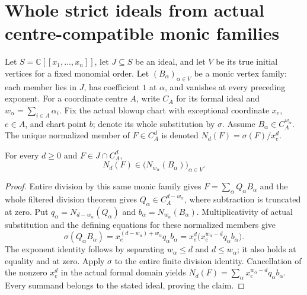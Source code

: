 \section{Whole strict ideals from actual centre-compatible monic families}

Let $S=\mathbb C[[x_1,\ldots,x_n]]$, let $J\subseteq S$ be an ideal,
and let $V$ be its true initial vertices for a fixed monomial order.
Let $(B_\alpha)_{\alpha\in V}$ be a monic vertex family: each member lies
in $J$, has coefficient $1$ at $\alpha$, and vanishes at every preceding
exponent. For a coordinate centre $A$, write $C_A$ for its formal ideal and
$w_\alpha=\sum_{i\in A}\alpha_i$. Fix the actual blowup chart with
exceptional coordinate $x_e$, $e\in A$, and chart point $b$; denote its
whole substitution by $\sigma$. Assume $B_\alpha\in C_A^{w_\alpha}$.
The unique normalized member of $F\in C_A^d$ is denoted
$N_d(F)=\sigma(F)/x_e^d$.

\begin{lemma}
\label{hir:actual-family-normalized-member-generation}
\leanok
For every $d\geq0$ and $F\in J\cap C_A^d$,
\[
 N_d(F)\in \bigl(N_{w_\alpha}(B_\alpha)\bigr)_{\alpha\in V}.
\]
\end{lemma}
\begin{proof}
Entire division by this same monic family gives
$F=\sum_\alpha Q_\alpha B_\alpha$ and the whole filtered division theorem
gives $Q_\alpha\in C_A^{d-w_\alpha}$, where subtraction is truncated
at zero. Put $q_\alpha=N_{d-w_\alpha}(Q_\alpha)$ and
$b_\alpha=N_{w_\alpha}(B_\alpha)$. Multiplicativity of actual substitution
and the defining equations for these normalized members give
\[
 \sigma(Q_\alpha B_\alpha)
 =x_e^{(d-w_\alpha)+w_\alpha}q_\alpha b_\alpha
 =x_e^d\bigl(x_e^{w_\alpha-d}q_\alpha b_\alpha\bigr).
\]
The exponent identity follows by separating $w_\alpha\leq d$ and
$d\leq w_\alpha$; it also holds at equality and at zero.
Apply $\sigma$ to the entire finite division identity. Cancellation of
the nonzero $x_e^d$ in the actual formal domain yields
$N_d(F)=\sum_\alpha x_e^{w_\alpha-d}q_\alpha b_\alpha$.
Every summand belongs to the stated ideal, proving the claim.
\end{proof}

